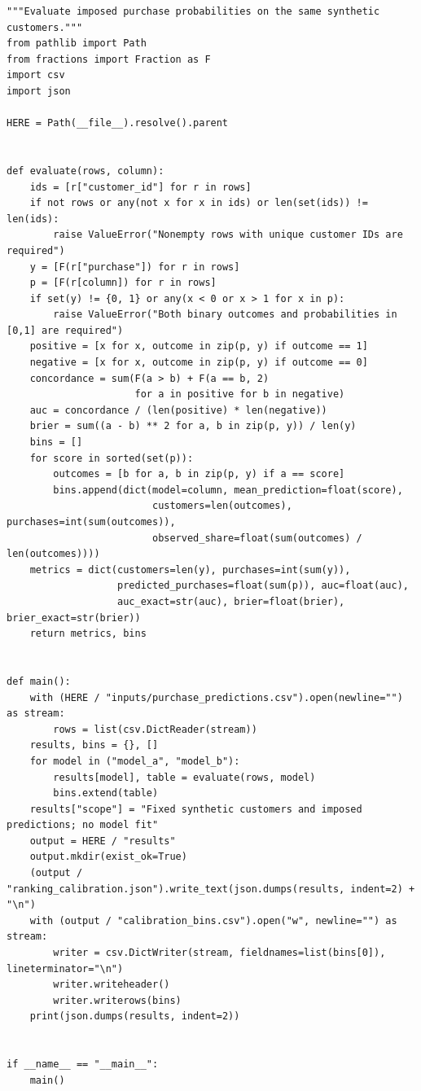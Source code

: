 \begin{Verbatim}[breaklines,breakanywhere,fontsize=\small]
"""Evaluate imposed purchase probabilities on the same synthetic customers."""
from pathlib import Path
from fractions import Fraction as F
import csv
import json

HERE = Path(__file__).resolve().parent


def evaluate(rows, column):
    ids = [r["customer_id"] for r in rows]
    if not rows or any(not x for x in ids) or len(set(ids)) != len(ids):
        raise ValueError("Nonempty rows with unique customer IDs are required")
    y = [F(r["purchase"]) for r in rows]
    p = [F(r[column]) for r in rows]
    if set(y) != {0, 1} or any(x < 0 or x > 1 for x in p):
        raise ValueError("Both binary outcomes and probabilities in [0,1] are required")
    positive = [x for x, outcome in zip(p, y) if outcome == 1]
    negative = [x for x, outcome in zip(p, y) if outcome == 0]
    concordance = sum(F(a > b) + F(a == b, 2)
                      for a in positive for b in negative)
    auc = concordance / (len(positive) * len(negative))
    brier = sum((a - b) ** 2 for a, b in zip(p, y)) / len(y)
    bins = []
    for score in sorted(set(p)):
        outcomes = [b for a, b in zip(p, y) if a == score]
        bins.append(dict(model=column, mean_prediction=float(score),
                         customers=len(outcomes), purchases=int(sum(outcomes)),
                         observed_share=float(sum(outcomes) / len(outcomes))))
    metrics = dict(customers=len(y), purchases=int(sum(y)),
                   predicted_purchases=float(sum(p)), auc=float(auc),
                   auc_exact=str(auc), brier=float(brier), brier_exact=str(brier))
    return metrics, bins


def main():
    with (HERE / "inputs/purchase_predictions.csv").open(newline="") as stream:
        rows = list(csv.DictReader(stream))
    results, bins = {}, []
    for model in ("model_a", "model_b"):
        results[model], table = evaluate(rows, model)
        bins.extend(table)
    results["scope"] = "Fixed synthetic customers and imposed predictions; no model fit"
    output = HERE / "results"
    output.mkdir(exist_ok=True)
    (output / "ranking_calibration.json").write_text(json.dumps(results, indent=2) + "\n")
    with (output / "calibration_bins.csv").open("w", newline="") as stream:
        writer = csv.DictWriter(stream, fieldnames=list(bins[0]), lineterminator="\n")
        writer.writeheader()
        writer.writerows(bins)
    print(json.dumps(results, indent=2))


if __name__ == "__main__":
    main()
\end{Verbatim}

